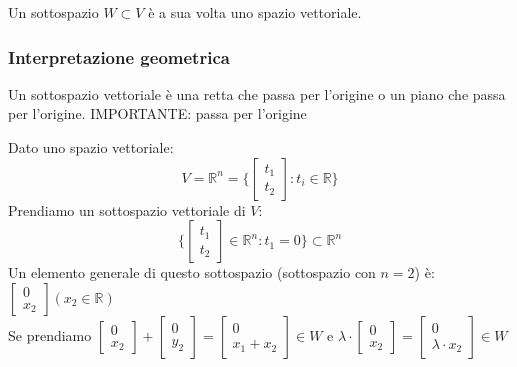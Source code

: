 \begin{proposition}
Un sottospazio $W \subset V$ è a sua volta uno spazio vettoriale.
\end{proposition}

\subsubsection{Interpretazione geometrica}
Un sottospazio vettoriale è una retta che passa per l'origine o un piano che passa per l'origine. IMPORTANTE: passa per l'origine

\begin{example}
Dato uno spazio vettoriale:
\begin{equation*}
	V = \mathbb{R}^n = \Bigg \{\begin{bmatrix}t_1\\ t_2\end{bmatrix}: t_i \in \mathbb{R}\Bigg\}
\end{equation*}
Prendiamo un sottospazio vettoriale di $V$:
\begin{equation*}
	\Bigg \{\begin{bmatrix}t_1\\ t_2\end{bmatrix} \in \mathbb{R}^n : t_1 = 0\Bigg\} \subset \mathbb{R}^n
\end{equation*}
Un elemento generale di questo sottospazio (sottospazio con $n=2$) è: $\begin{bmatrix}0\\x_2\end{bmatrix}(x_2 \in \mathbb{R})$\\
Se prendiamo $\begin{bmatrix}0\\x_2\end{bmatrix} + \begin{bmatrix}0\\y_2\end{bmatrix} = \begin{bmatrix}0\\x_1 + x_2\end{bmatrix} \in W$ e $\lambda \cdot \begin{bmatrix}0\\x_2\end{bmatrix} = \begin{bmatrix}0\\\lambda \cdot x_2\end{bmatrix} \in W$\\\\

\end{example}
